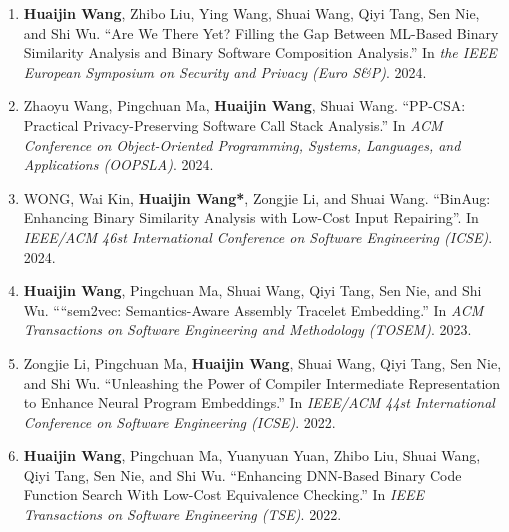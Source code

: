 \begin{enumerate}
    \item \textbf{Huaijin Wang}, Zhibo Liu, Ying Wang, Shuai Wang, Qiyi Tang, Sen Nie, and Shi Wu.
    ``Are We There Yet? Filling the Gap Between ML-Based Binary Similarity Analysis and Binary Software Composition Analysis.''
    In \textit{the IEEE European Symposium on Security and Privacy (Euro S\&P)}. 2024.
    
    \item Zhaoyu Wang, Pingchuan Ma, \textbf{Huaijin Wang}, Shuai Wang.
    ``PP-CSA: Practical Privacy-Preserving Software Call Stack Analysis.''
    In \textit{ACM Conference on Object-Oriented Programming, Systems, Languages, and Applications (OOPSLA)}. 2024.
    
    \item WONG, Wai Kin, \textbf{Huaijin Wang*}, Zongjie Li, and Shuai Wang.
    ``BinAug: Enhancing Binary Similarity Analysis with Low-Cost Input Repairing''.
    In \textit{IEEE/ACM 46st International Conference on Software Engineering (ICSE)}. 2024.
    
    
    \item \textbf{Huaijin Wang}, Pingchuan Ma, Shuai Wang, Qiyi Tang, Sen Nie, and Shi Wu.
    ``“sem2vec: Semantics-Aware Assembly Tracelet Embedding.''
    In \textit{ACM Transactions on Software Engineering and Methodology (TOSEM)}. 2023.
    
    \item Zongjie Li, Pingchuan Ma, \textbf{Huaijin Wang}, Shuai Wang, Qiyi Tang, Sen Nie, and Shi Wu.
    ``Unleashing the Power of Compiler
    Intermediate Representation to Enhance Neural Program Embeddings.''
    In \textit{IEEE/ACM 44st International Conference on Software Engineering (ICSE)}. 2022.
    
    \item \textbf{Huaijin Wang}, Pingchuan Ma, Yuanyuan Yuan, Zhibo Liu, Shuai Wang, Qiyi Tang, Sen Nie, and Shi Wu.
    ``Enhancing DNN-Based
    Binary Code Function Search With Low-Cost Equivalence Checking.''
    In \textit{IEEE Transactions on Software Engineering (TSE)}. 2022.
    
    

\end{enumerate}
